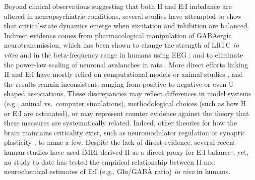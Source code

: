 \documentclass[
true
]{sn-jnl}
\begin{document}
Beyond clinical observations suggesting that both H and E:I imbalance
are altered in neuropsychiatric conditions, several studies have
attempted to show that critical-state dynamics emerge when excitation
and inhibition are balanced. Indirect evidence comes from
pharmacological manipulation of GABAergic neurotransmission, which has
been shown to change the strength of LRTC \emph{in vitro}
\citep{poilFastNetworkOscillations2011} and in the beta-frequency range
in humans using EEG \citep{montoEpileptogenicNeocorticalNetworks2007};
and to eliminate the power-law scaling of neuronal avalanches in rats
\citep{beggsNeuronalAvalanchesNeocortical2003, gireeshNeuronalAvalanchesOrganize2008, yangMaximalVariabilityPhase2012}.
More direct efforts linking H and E:I have mostly relied on
computational models or animal studies
\citep{liangExcitationInhibitionBalance2024, poilCriticalStateDynamicsAvalanches2012, lombardiBalanceExcitationInhibition2017, baumgartenCriticalExcitationinhibitionBalance2019, bruiningMeasurementExcitationinhibitionRatio2020, trakoshisIntrinsicExcitationinhibitionImbalance, gaoInferringSynapticExcitation2017},
and the results remain inconsistent, ranging from positive to negative
or even U-shaped associations. These discrepancies may reflect
differences in model systems (e.g., animal vs.~computer simulations),
methodological choices (such as how H or E:I are estimated), or may
represent counter evidence against the theory that these measures are
systematically related. Indeed, other theories for how the brain
maintains criticality exist, such as neuromodulator regulation
\citep{obyrneHowCriticalBrain2022, plenzSelfOrganizedCriticalityBrain2021, avramieaRegulationCriticalBrain2023}
or synaptic plasticity
\citep{zeraatiSelfOrganizationCriticalitySynaptic2021, ikedaEmergentFunctionsNoisedriven2025},
to name a few. Despite the lack of direct evidence, several recent human
studies have used fMRI-derived H as a direct proxy for E:I balance
\citep{linkeAlteredDevelopmentHurst2024, xiePharmacoresistantTemporalLobe2024, uscatescuUsingExcitationInhibition2023, fotiadisMyelinationExcitationinhibitionBalance2023};
yet, no study to date has tested the empirical relationship between H
and neurochemical estimates of E:I (e.g., Glu/GABA ratio) \emph{in vivo}
in humans.
\end{document}
